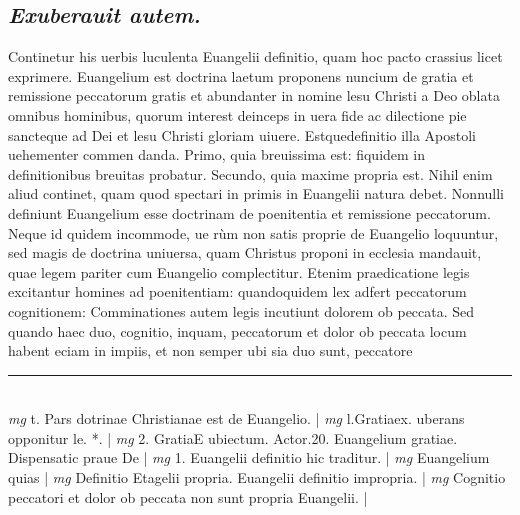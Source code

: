 \documentclass{article}
\begin{document}
\begin{pages}
\subsection*{\textit{Exuberauit autem. }}\pstart Continetur his uerbis luculenta Euangelii definitio, quam hoc pacto crassius licet exprimere. Euangelium est doctrina laetum proponens nuncium de gratia et remissione peccatorum gratis et abundanter in nomine lesu Christi a Deo oblata omnibus hominibus, quorum interest deinceps in uera fide ac dilectione pie sancteque  ad Dei et lesu Christi gloriam uiuere. Estquedefinitio illa Apostoli uehementer commen danda. Primo, quia breuissima est: fiquidem in definitionibus breuitas probatur. Secundo, quia maxime propria est. Nihil enim aliud continet, quam quod spectari in primis in Euangelii natura debet. Nonnulli definiunt Euangelium esse doctrinam de poenitentia et remissione peccatorum. Neque id quidem incommode, ue rùm non satis proprie de Euangelio loquuntur, sed magis de doctrina uniuersa, quam Christus proponi in ecclesia mandauit, quae legem pariter cum Euangelio complectitur. Etenim praedicatione legis excitantur homines ad poenitentiam: quandoquidem lex adfert peccatorum cognitionem: Comminationes autem legis incutiunt dolorem ob peccata. Sed quando haec duo, cognitio, inquam, peccatorum et dolor ob peccata locum habent eciam in impiis, et non semper ubi sia duo sunt, peccatore  \pend
\vspace{0.5cm}\noindent
\vspace{0.2cm}\rule{1cm}{0.2pt}\\ 
\hspace{0.2cm}\textit{mg}
\footnotesize t. Pars dotrinae Christianae est de Euangelio. 
\normalsize| 
\hspace{0.2cm}\textit{mg}
\footnotesize l.Gratiaex. uberans opponitur le. *. 
\normalsize| 
\hspace{0.2cm}\textit{mg}
\footnotesize 2. GratiaE  ubiectum. Actor.20. Euangelium gratiae. Dispensatic praue De 
\normalsize| 
\hspace{0.2cm}\textit{mg}
\footnotesize 1. Euangelii definitio hic traditur. 
\normalsize| 
\hspace{0.2cm}\textit{mg}
\footnotesize Euangelium quias 
\normalsize| 
\hspace{0.2cm}\textit{mg}
\footnotesize Definitio Etagelii propria. Euangelii definitio impropria. 
\normalsize| 
\hspace{0.2cm}\textit{mg}
\footnotesize Cognitio peccatori et dolor ob peccata non sunt propria Euangelii. 
\normalsize| 

\end{pages}
\end{document}
